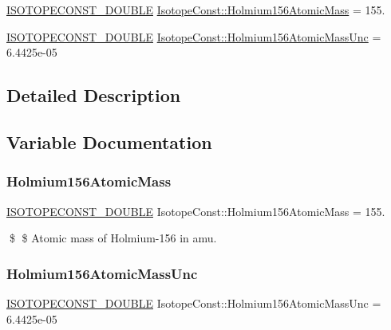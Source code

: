 \begin{DoxyCompactItemize}
\item 
\mbox{\hyperlink{group___isotope_const-_macros_ga8f45a7272ce02c0b4c65c44636ed719a}{I\+S\+O\+T\+O\+P\+E\+C\+O\+N\+S\+T\+\_\+\+D\+O\+U\+B\+LE}} \mbox{\hyperlink{group___isotope_const-_holmium-_ho156_ga892c0461503c9faeb60ca60cff5d0d41}{Isotope\+Const\+::\+Holmium156\+Atomic\+Mass}} = 155.
\item 
\mbox{\hyperlink{group___isotope_const-_macros_ga8f45a7272ce02c0b4c65c44636ed719a}{I\+S\+O\+T\+O\+P\+E\+C\+O\+N\+S\+T\+\_\+\+D\+O\+U\+B\+LE}} \mbox{\hyperlink{group___isotope_const-_holmium-_ho156_ga47efc2fd6a750b10b24c25e1463718c3}{Isotope\+Const\+::\+Holmium156\+Atomic\+Mass\+Unc}} = 6.\+4425e-\/05
\end{DoxyCompactItemize}


\subsection{Detailed Description}


\subsection{Variable Documentation}
\mbox{\label{group___isotope_const-_holmium-_ho156_ga892c0461503c9faeb60ca60cff5d0d41}} 
\subsubsection{\texorpdfstring{Holmium156\+Atomic\+Mass}{Holmium156AtomicMass}}
{\footnotesize\ttfamily \mbox{\hyperlink{group___isotope_const-_macros_ga8f45a7272ce02c0b4c65c44636ed719a}{I\+S\+O\+T\+O\+P\+E\+C\+O\+N\+S\+T\+\_\+\+D\+O\+U\+B\+LE}} Isotope\+Const\+::\+Holmium156\+Atomic\+Mass = 155.}

\$ \$ Atomic mass of Holmium-\/156 in amu. \mbox{\label{group___isotope_const-_holmium-_ho156_ga47efc2fd6a750b10b24c25e1463718c3}} 
\subsubsection{\texorpdfstring{Holmium156\+Atomic\+Mass\+Unc}{Holmium156AtomicMassUnc}}
{\footnotesize\ttfamily \mbox{\hyperlink{group___isotope_const-_macros_ga8f45a7272ce02c0b4c65c44636ed719a}{I\+S\+O\+T\+O\+P\+E\+C\+O\+N\+S\+T\+\_\+\+D\+O\+U\+B\+LE}} Isotope\+Const\+::\+Holmium156\+Atomic\+Mass\+Unc = 6.\+4425e-\/05}

